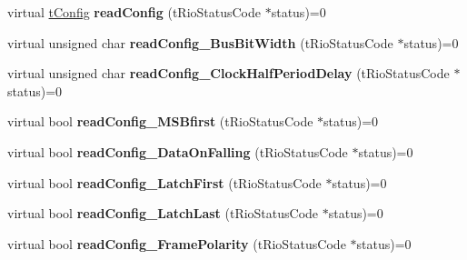 \begin{DoxyCompactItemize}
\item 
\hypertarget{classnFPGA_1_1nFRC__2012__1__6__4_1_1tSPI_a4a8b165e516c2994eff55b68dd859ab1}{
virtual \hyperlink{unionnFPGA_1_1nFRC__2012__1__6__4_1_1tSPI_1_1tConfig}{tConfig} {\bfseries readConfig} (tRioStatusCode $\ast$status)=0}
\label{classnFPGA_1_1nFRC__2012__1__6__4_1_1tSPI_a4a8b165e516c2994eff55b68dd859ab1}

\item 
\hypertarget{classnFPGA_1_1nFRC__2012__1__6__4_1_1tSPI_a93b1af4a95f3c44eb4814183779f8951}{
virtual unsigned char {\bfseries readConfig\_\-BusBitWidth} (tRioStatusCode $\ast$status)=0}
\label{classnFPGA_1_1nFRC__2012__1__6__4_1_1tSPI_a93b1af4a95f3c44eb4814183779f8951}

\item 
\hypertarget{classnFPGA_1_1nFRC__2012__1__6__4_1_1tSPI_a6815feb7fb8c6bc62e2c08228a84001b}{
virtual unsigned char {\bfseries readConfig\_\-ClockHalfPeriodDelay} (tRioStatusCode $\ast$status)=0}
\label{classnFPGA_1_1nFRC__2012__1__6__4_1_1tSPI_a6815feb7fb8c6bc62e2c08228a84001b}

\item 
\hypertarget{classnFPGA_1_1nFRC__2012__1__6__4_1_1tSPI_a41f13536c59934a0bb2fd079c9522321}{
virtual bool {\bfseries readConfig\_\-MSBfirst} (tRioStatusCode $\ast$status)=0}
\label{classnFPGA_1_1nFRC__2012__1__6__4_1_1tSPI_a41f13536c59934a0bb2fd079c9522321}

\item 
\hypertarget{classnFPGA_1_1nFRC__2012__1__6__4_1_1tSPI_a5d50ebef3eaf5acca7aba56053414405}{
virtual bool {\bfseries readConfig\_\-DataOnFalling} (tRioStatusCode $\ast$status)=0}
\label{classnFPGA_1_1nFRC__2012__1__6__4_1_1tSPI_a5d50ebef3eaf5acca7aba56053414405}

\item 
\hypertarget{classnFPGA_1_1nFRC__2012__1__6__4_1_1tSPI_a4999b71a32a2073604019f4dd0b8ea93}{
virtual bool {\bfseries readConfig\_\-LatchFirst} (tRioStatusCode $\ast$status)=0}
\label{classnFPGA_1_1nFRC__2012__1__6__4_1_1tSPI_a4999b71a32a2073604019f4dd0b8ea93}

\item 
\hypertarget{classnFPGA_1_1nFRC__2012__1__6__4_1_1tSPI_a1d02e121db1b5c35646e5a32ea7175f0}{
virtual bool {\bfseries readConfig\_\-LatchLast} (tRioStatusCode $\ast$status)=0}
\label{classnFPGA_1_1nFRC__2012__1__6__4_1_1tSPI_a1d02e121db1b5c35646e5a32ea7175f0}

\item 
\hypertarget{classnFPGA_1_1nFRC__2012__1__6__4_1_1tSPI_a930d4a3c3f0ca8865970620b7257fda5}{
virtual bool {\bfseries readConfig\_\-FramePolarity} (tRioStatusCode $\ast$status)=0}
\label{classnFPGA_1_1nFRC__2012__1__6__4_1_1tSPI_a930d4a3c3f0ca8865970620b7257fda5}


\end{DoxyCompactItemize}
